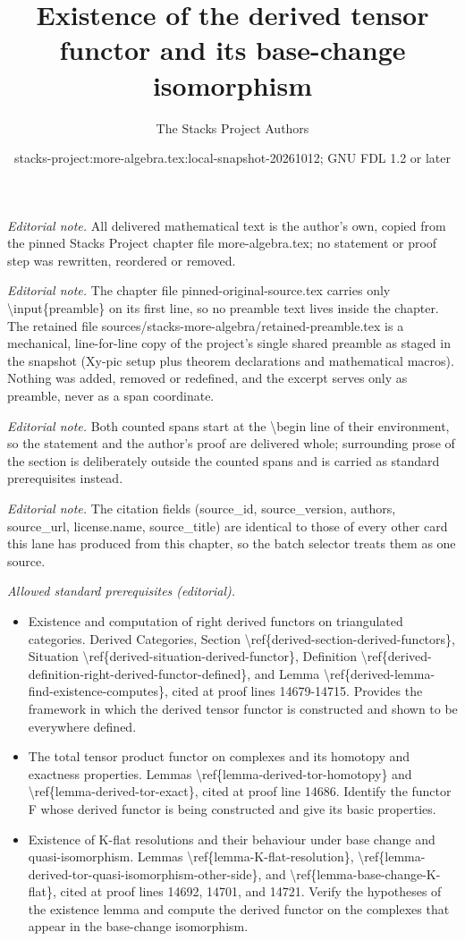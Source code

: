 \documentclass[10pt,a4paper]{amsart}
\title{Existence of the derived tensor functor and its base-change isomorphism}
\author{The Stacks Project Authors}
\date{stacks-project:more-algebra.tex:local-snapshot-20261012; GNU FDL 1.2 or later}
\theoremstyle{plain}
\theoremstyle{definition}
\theoremstyle{remark}
\numberwithin{equation}{subsection}
\begin{document}
\maketitle
\setcounter{subsection}{1}
\noindent\textit{Editorial note.} All delivered mathematical text is the author's own, copied from the pinned Stacks Project chapter file more-algebra.tex; no statement or proof step was rewritten, reordered or removed.\par\medskip
\noindent\textit{Editorial note.} The chapter file pinned-original-source.tex carries only \textbackslash{}input\{preamble\} on its first line, so no preamble text lives inside the chapter. The retained file sources/stacks-more-algebra/retained-preamble.tex is a mechanical, line-for-line copy of the project's single shared preamble as staged in the snapshot (Xy-pic setup plus theorem declarations and mathematical macros). Nothing was added, removed or redefined, and the excerpt serves only as preamble, never as a span coordinate.\par\medskip
\noindent\textit{Editorial note.} Both counted spans start at the \textbackslash{}begin line of their environment, so the statement and the author's proof are delivered whole; surrounding prose of the section is deliberately outside the counted spans and is carried as standard prerequisites instead.\par\medskip
\noindent\textit{Editorial note.} The citation fields (source\_id, source\_version, authors, source\_url, license.name, source\_title) are identical to those of every other card this lane has produced from this chapter, so the batch selector treats them as one source.\par\medskip
\noindent\textit{Allowed standard prerequisites (editorial).}\begin{itemize}
\item Existence and computation of right derived functors on triangulated categories. Derived Categories, Section \textbackslash{}ref\{derived-section-derived-functors\}, Situation \textbackslash{}ref\{derived-situation-derived-functor\}, Definition \textbackslash{}ref\{derived-definition-right-derived-functor-defined\}, and Lemma \textbackslash{}ref\{derived-lemma-find-existence-computes\}, cited at proof lines 14679-14715. Provides the framework in which the derived tensor functor is constructed and shown to be everywhere defined.
\item The total tensor product functor on complexes and its homotopy and exactness properties. Lemmas \textbackslash{}ref\{lemma-derived-tor-homotopy\} and \textbackslash{}ref\{lemma-derived-tor-exact\}, cited at proof line 14686. Identify the functor F whose derived functor is being constructed and give its basic properties.
\item Existence of K-flat resolutions and their behaviour under base change and quasi-isomorphism. Lemmas \textbackslash{}ref\{lemma-K-flat-resolution\}, \textbackslash{}ref\{lemma-derived-tor-quasi-isomorphism-other-side\}, and \textbackslash{}ref\{lemma-base-change-K-flat\}, cited at proof lines 14692, 14701, and 14721. Verify the hypotheses of the existence lemma and compute the derived functor on the complexes that appear in the base-change isomorphism.
\end{itemize}\medskip
\end{document}
